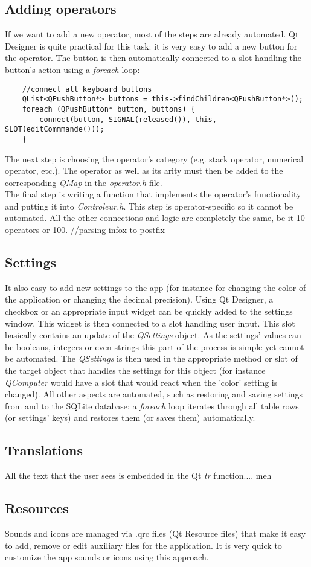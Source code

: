 \documentclass[titlepage]{article}
\begin{document}
	\subsection{Adding operators}
	If we want to add a new operator, most of the steps are already automated. Qt Designer is quite practical for this task: it is very easy to add a new button for the operator. The button is then automatically connected to a slot handling the button's action using a \textit{foreach} loop: 
	\begin{lstlisting}
    //connect all keyboard buttons
    QList<QPushButton*> buttons = this->findChildren<QPushButton*>();
    foreach (QPushButton* button, buttons) {
        connect(button, SIGNAL(released()), this, SLOT(editCommmande()));
    }
	\end{lstlisting}
	The next step is choosing the operator's category (e.g. stack operator, numerical operator, etc.). The operator as well as its arity must then be added to the corresponding \textit{QMap} in the \textit{operator.h} file. \\
	The final step is writing a function that implements the operator's functionality and putting it into \textit{Controleur.h}. This step is operator-specific so it cannot be automated. All the other connections and logic are completely the same, be it 10 operators or 100.
    //parsing infox to postfix
	\subsection{Settings}
	It also easy to add new settings to the app (for instance for changing the color of the application or changing the decimal precision). Using Qt Designer, a checkbox or an appropriate input widget can be quickly added to the settings window. This widget is then connected to a slot handling user input. This slot basically contains an update of the \textit{QSettings} object. As the settings' values can be booleans, integers or even strings this part of the process is simple yet cannot be automated. The \textit{QSettings} is then used in the appropriate method or slot of the target object that handles the settings for this object (for instance \textit{QComputer} would have a slot that would react when the 'color' setting is changed). All other aspects are automated, such as restoring and saving settings from and to the SQLite database: a \textit{foreach} loop iterates through all table rows (or settings' keys) and restores them (or saves them) automatically.
	\subsection{Translations}
	All the text that the user sees is embedded in the Qt \textit{tr} function.... meh
	\subsection{Resources}
	Sounds and icons are managed via .qrc files (Qt Resource files) that make it easy to add, remove or edit auxiliary files for the application. It is very quick to customize the app sounds or icons using this approach.
\end{document}
